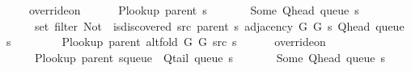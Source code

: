 \begin{isabellebody}
\ \ \ \ \ override{\isacharunderscore}{\kern0pt}on\isanewline
\ \ \ \ \ \ {\isacharparenleft}{\kern0pt}P{\isacharunderscore}{\kern0pt}lookup\ {\isacharparenleft}{\kern0pt}parent\ s{\isacharparenright}{\kern0pt}{\isacharparenright}{\kern0pt}\isanewline
\ \ \ \ \ \ {\isacharparenleft}{\kern0pt}{\isasymlambda}{\isacharunderscore}{\kern0pt}{\isachardot}{\kern0pt}\ Some\ {\isacharparenleft}{\kern0pt}Q{\isacharunderscore}{\kern0pt}head\ {\isacharparenleft}{\kern0pt}queue\ s{\isacharparenright}{\kern0pt}{\isacharparenright}{\kern0pt}{\isacharparenright}{\kern0pt}\isanewline
\ \ \ \ \ \ {\isacharparenleft}{\kern0pt}set\ {\isacharparenleft}{\kern0pt}filter\ {\isacharparenleft}{\kern0pt}Not\ {\isasymcirc}\ is{\isacharunderscore}{\kern0pt}discovered\ src\ {\isacharparenleft}{\kern0pt}parent\ s{\isacharparenright}{\kern0pt}{\isacharparenright}{\kern0pt}\ {\isacharparenleft}{\kern0pt}adjacency\ G{}\ G{}\ s\ {\isacharparenleft}{\kern0pt}Q{\isacharunderscore}{\kern0pt}head\ {\isacharparenleft}{\kern0pt}queue\ s{\isacharparenright}{\kern0pt}{\isacharparenright}{\kern0pt}{\isacharparenright}{\kern0pt}{\isacharparenright}{\kern0pt}{\isacharparenright}{\kern0pt}{\isachardoublequoteclose}\isanewline
%
\isadelimproof
%
\endisadelimproof
%
\isatagproof
{}\isamarkupfalse%
\ {\isacharminus}{\kern0pt}\isanewline
\ \ \isamarkupfalse%
\isanewline
\ \ \ \ {\isachardoublequoteopen}P{\isacharunderscore}{\kern0pt}lookup\ {\isacharparenleft}{\kern0pt}parent\ {\isacharparenleft}{\kern0pt}alt{\isacharunderscore}{\kern0pt}fold\ G{}\ G{}\ src\ s{\isacharparenright}{\kern0pt}{\isacharparenright}{\kern0pt}\ {\isacharequal}{\kern0pt}\isanewline
\ \ \ \ \ override{\isacharunderscore}{\kern0pt}on\isanewline
\ \ \ \ \ \ {\isacharparenleft}{\kern0pt}P{\isacharunderscore}{\kern0pt}lookup\ {\isacharparenleft}{\kern0pt}parent\ {\isacharparenleft}{\kern0pt}s{\isasymlparr}queue\ {\isacharcolon}{\kern0pt}{\isacharequal}{\kern0pt}\ Q{\isacharunderscore}{\kern0pt}tail\ {\isacharparenleft}{\kern0pt}queue\ s{\isacharparenright}{\kern0pt}{\isasymrparr}{\isacharparenright}{\kern0pt}{\isacharparenright}{\kern0pt}{\isacharparenright}{\kern0pt}\isanewline
\ \ \ \ \ \ {\isacharparenleft}{\kern0pt}{\isasymlambda}{\isacharunderscore}{\kern0pt}{\isachardot}{\kern0pt}\ Some\ {\isacharparenleft}{\kern0pt}Q{\isacharunderscore}{\kern0pt}head\ {\isacharparenleft}{\kern0pt}queue\ s{\isacharparenright}{\kern0pt}{\isacharparenright}{\kern0pt}{\isacharparenright}{\kern0pt}\isanewline

\end{isabellebody}
